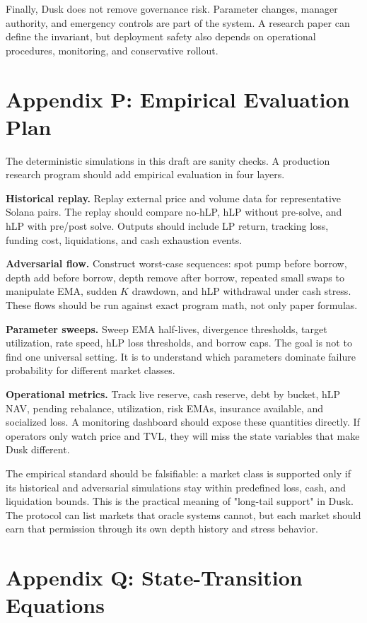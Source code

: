 \documentclass[11pt]{article}
\begin{document}
Finally, Dusk does not remove governance risk. Parameter changes, manager authority, and emergency controls are part of the system. A research paper can define the invariant, but deployment safety also depends on operational procedures, monitoring, and conservative rollout.

\section{Appendix P: Empirical Evaluation Plan}

The deterministic simulations in this draft are sanity checks. A production research program should add empirical evaluation in four layers.

\textbf{Historical replay.} Replay external price and volume data for representative Solana pairs. The replay should compare no-hLP, hLP without pre-solve, and hLP with pre/post solve. Outputs should include LP return, tracking loss, funding cost, liquidations, and cash exhaustion events.

\textbf{Adversarial flow.} Construct worst-case sequences: spot pump before borrow, depth add before borrow, depth remove after borrow, repeated small swaps to manipulate EMA, sudden $K$ drawdown, and hLP withdrawal under cash stress. These flows should be run against exact program math, not only paper formulas.

\textbf{Parameter sweeps.} Sweep EMA half-lives, divergence thresholds, target utilization, rate speed, hLP loss thresholds, and borrow caps. The goal is not to find one universal setting. It is to understand which parameters dominate failure probability for different market classes.

\textbf{Operational metrics.} Track live reserve, cash reserve, debt by bucket, hLP NAV, pending rebalance, utilization, risk EMAs, insurance available, and socialized loss. A monitoring dashboard should expose these quantities directly. If operators only watch price and TVL, they will miss the state variables that make Dusk different.

The empirical standard should be falsifiable: a market class is supported only if its historical and adversarial simulations stay within predefined loss, cash, and liquidation bounds. This is the practical meaning of "long-tail support" in Dusk. The protocol can list markets that oracle systems cannot, but each market should earn that permission through its own depth history and stress behavior.

\section{Appendix Q: State-Transition Equations}
\end{document}
